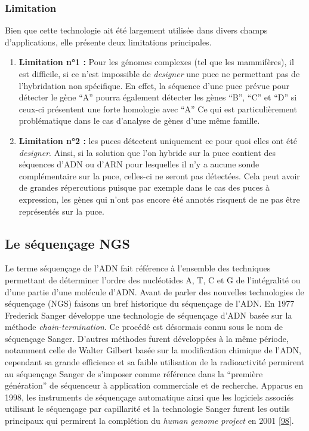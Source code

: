 \documentclass[12pt,twoside]{reedthesis}
\theoremstyle{definition}
\theoremstyle{definition}
\theoremstyle{remark}
\begin{document}
  \subsubsection{Limitation}\label{limitation}
  
  Bien que cette technologie ait été largement utilisée dans divers champs
  d'applications, elle présente deux limitations principales.
  
  \begin{enumerate}
  \def\labelenumi{\arabic{enumi}.}
  \item
    \textbf{Limitation n°1 :} Pour les génomes complexes (tel que les
    mammifères), il est difficile, si ce n'est impossible de
    \emph{designer} une puce ne permettant pas de l'hybridation non
    spécifique. En effet, la séquence d'une puce prévue pour détecter le
    gène ``A'' pourra également détecter les gènes ``B'', ``C'' et ``D''
    si ceux-ci présentent une forte homologie avec ``A'' Ce qui est
    particulièrement problématique dans le cas d'analyse de gènes d'une
    même famille.
  \item
    \textbf{Limitation n°2 :} les puces détectent uniquement ce pour quoi
    elles ont été \emph{designer}. Ainsi, si la solution que l'on hybride
    sur la puce contient des séquences d'ADN ou d'ARN pour lesquelles il
    n'y a aucune sonde complémentaire sur la puce, celles-ci ne seront pas
    détectées. Cela peut avoir de grandes répercutions puisque par exemple
    dans le cas des puces à expression, les gènes qui n'ont pas encore été
    annotés risquent de ne pas être représentés sur la puce.
  \end{enumerate}
  
  \newpage
  
  \hypertarget{ngs}{\subsection{Le séquençage NGS}\label{ngs}}
  
  Le terme séquençage de l'ADN fait référence à l'ensemble des techniques
  permettant de déterminer l'ordre des nucléotides A, T, C et G de
  l'intégralité ou d'une partie d'une molécule d'ADN. Avant de parler des
  nouvelles technologies de séquençage (NGS) faisons un bref historique du
  séquençage de l'ADN. En 1977 Frederick Sanger développe une technologie
  de séquençage d'ADN basée sur la méthode \emph{chain-termination}. Ce
  procédé est désormais connu sous le nom de séquençage Sanger. D'autres
  méthodes furent développées à la même période, notamment celle de Walter
  Gilbert basée sur la modification chimique de l'ADN, cependant sa grande
  efficience et sa faible utilisation de la radioactivité permirent au
  séquençage Sanger de s'imposer comme référence dans la ``première
  génération'' de séquenceur à application commerciale et de recherche.
  Apparus en 1998, les instruments de séquençage automatique ainsi que les
  logiciels associés utilisant le séquençage par capillarité et la
  technologie Sanger furent les outils principaux qui permirent la
  complétion du \emph{human genome project} en 2001
  {[}\protect\hyperlink{ref-Collins2003}{98}{]}.
  
\end{document}
